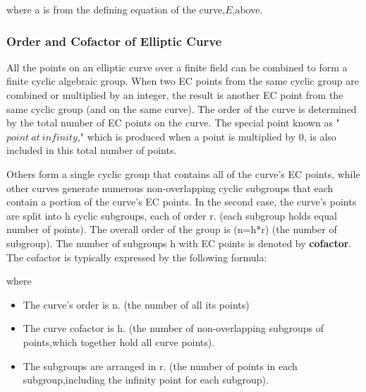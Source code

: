 \documentclass{article}
\begin{document}

\begin{center}
\end{center}
where a is from the defining equation of the curve,$E$,above.
\newline

\begin{centre}
\hspace{3.1cm}
\end{centre}
\begin{centre}
\end{centre}
\subsubsection{Order and Cofactor of Elliptic Curve}
All the points on an elliptic curve over a finite field can be combined to form a finite cyclic algebraic group. When two EC points from the same cyclic group are combined or multiplied by an integer, the result is another EC point from the same cyclic group (and on the same curve). The order of the curve is determined by the total number of EC points on the curve. The special point known as "$point\:at\:infinity$," which is produced when a point is multiplied by 0, is also included in this total number of points.

Others form a single cyclic group that contains all of the curve's EC points, while other curves generate numerous non-overlapping cyclic subgroups that each contain a portion of the curve's EC points. In the second case, the curve's points are split into h cyclic subgroups, each of order r. (each subgroup holds equal number of points). The overall order of the group is (n=h*r) (the number of subgroup). The number of subgroups h with EC points is denoted by
\textbf{cofactor}.
The cofactor is typically expressed by the following formula:
\begin{center}
    \centering
\end{center}

where 
\begin{itemize}
    \item The curve's order is n. (the number of all its points)
    \item The curve cofactor is h. (the number of non-overlapping subgroups of points,which together hold all curve points).
    \item The subgroups are arranged in r. (the number of points in each subgroup,including the infinity point for each subgroup).
\end{itemize}
\end{document}
